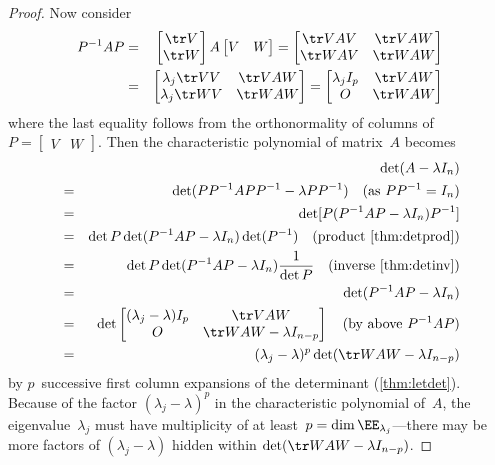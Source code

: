 \begin{proof}
Now consider
\begin{eqnarray*}
P^{-1}AP
&=&\begin{bmatrix} \tr V\\\tr W \end{bmatrix}A\begin{bmatrix} V&W \end{bmatrix}
=\begin{bmatrix} \tr VAV&\tr VAW\\\tr WAV&\tr WAW \end{bmatrix}
\\
&=&\begin{bmatrix} \lambda_j\tr VV&\tr VAW\\\lambda_j\tr WV&\tr WAW \end{bmatrix}
=\begin{bmatrix} \lambda_jI_p&\tr VAW\\O&\tr WAW \end{bmatrix}
\end{eqnarray*}
where the last equality follows from the orthonormality of columns of \(P=\begin{bmatrix} V&W \end{bmatrix}\).
Then the characteristic polynomial of matrix~\(A\) becomes
\begin{eqnarray*}
&&\hspace{-1.5em}\det(A-\lambda I_n)
\\&=&\det(PP^{-1}APP^{-1}-\lambda PP^{-1})
\quad(\text{as }PP^{-1}=I_n)
\\&=&\det[P(P^{-1}AP-\lambda I_n)P^{-1}]
\\&=&\det P\det(P^{-1}AP-\lambda I_n)\det(P^{-1})
\quad(\text{product \autoref{thm:detprod}})
\\&=&\det P\det(P^{-1}AP-\lambda I_n)\frac1{\det P}
\quad(\text{inverse \autoref{thm:detinv}})
\\&=&\det(P^{-1}AP-\lambda I_n)
\\&=&\det\begin{bmatrix} (\lambda_j-\lambda)I_p&\tr VAW\\O&\tr WAW -\lambda I_{n-p}\end{bmatrix}
\quad(\text{by above }P^{-1}AP)
\\&=&(\lambda_j-\lambda)^p\det(\tr WAW -\lambda I_{n-p})
\end{eqnarray*}
by \(p\)~successive first column expansions of the determinant (\autoref{thm:letdet}).
Because of the factor \((\lambda_j-\lambda)^p\) in the characteristic polynomial of~\(A\), the eigenvalue~\(\lambda_j\) must have multiplicity of at least~\(p=\dim\EE_{\lambda_j}\)---there may be more factors of \((\lambda_j-\lambda)\) hidden within \(\det(\tr WAW -\lambda I_{n-p})\).
\end{proof}



